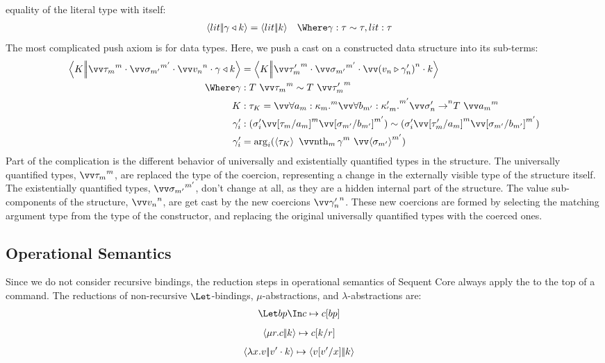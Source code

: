 \documentclass{article}
\begin{document}
equality of the literal type with itself:
\begin{align*}
  \cut{\lit}{\koerce{\cn}{\ko}}
  &=
  \cut{\lit}{\ko}
  &
  \Where
  \cn &: \eqty{\ty}{\ty}
  ,
  \lit : \ty
\end{align*}
The most complicated push axiom is for data types.  Here, we push a cast on a
constructed data structure into its sub-terms:
\begin{align*}
  \cut
  {K}
 {\app
   {\vect[m]{\ty_{m}}}
   {\app
     {\vect[m']{\sty_{m'}}}
     {\app
       {\vect[n]{\tm_n}}
       {\koerce{\cn}{\ko}}}}}
  &=
  \cut
  {K}
  {\app
    {\vect[m]{\ty'_{m}}}
    {\app
      {\vect[m']{\sty_{m'}}}
      {\app
        {\vect[n]{(\coerce{\tm_n}{\cn'_n})}}
        {\ko}}}}
  \\
  \Where
  \cn &: \eqty{T ~ \vect[m]{\ty_m}}{T ~ \vect[m]{\ty'_m}}
  \\
  K
  &:
  \ty_K
  =
  \vect[m]{\forall a_{m}:\ki_{m}.}
  \vect[m']{\forall b_{m'}:\ki'_{'m}.}
  \vect[n]{\sty'_n \to} T ~ \vect[m]{a_{m}}
  \\
  \cn'_i
  &:
  \eqty
  {(\sty'_i\vect[m]{\subst{a_{m}}{\ty_m}}\vect[m']{\subst{b_{m'}}{\sty_{m'}}})}
  {(\sty'_i\vect[m]{\subst{a_{m}}{\ty'_m}}\vect[m']{\subst{b_{m'}}{\sty_{m'}}})}
  \\
  \cn'_i &= \ntharg_i(\idcn{\ty_K} ~ \vect[m]{\nth_{m} \cn} ~ \vect[m']{\idcn{\sty_{m'}}})
\end{align*}
Part of the complication is the different behavior of universally and
existentially quantified types in the structure.  The universally quantified
types, $\vect[m]{\ty_{m}}$, are replaced the type of the coercion, representing
a change in the externally visible type of the structure itself.  The
existentially quantified types, $\vect[m']{\sty_{m'}}$, don't change at all, as
they are a hidden internal part of the structure.  The value sub-components of
the structure, $\vect[n]{\tm_n}$, are get cast by the new coercions
$\vect[n]{\cn'_n}$.  These new coercions are formed by selecting the matching
argument type from the type of the constructor, and replacing the original
universally quantified types with the coerced ones.

\subsection{Operational Semantics}

Since we do not consider recursive bindings, the reduction steps in operational
semantics of Sequent Core always apply the to the top of a command.  The
reductions of non-recursive $\Let$-bindings, $\mu$-abstractions, and
$\lambda$-abstractions are:
\begin{align*}
  \Let \nonrec{\bp} \In \cmd
  &\sred
  \cmd\subp{\bp}
\end{align*}
\begin{align*}
  \cut{\comp{r}\cmd}{\ko}
  &\sred
  \cmd\subst{r}{\ko}
\end{align*}
\begin{align*}
  \cut{\fn x \tm}{\app{\tm'}{\ko}}
  &\sred
  \cut{\tm\subst{x}{\tm'}}{\ko}
\end{align*}
\end{document}
